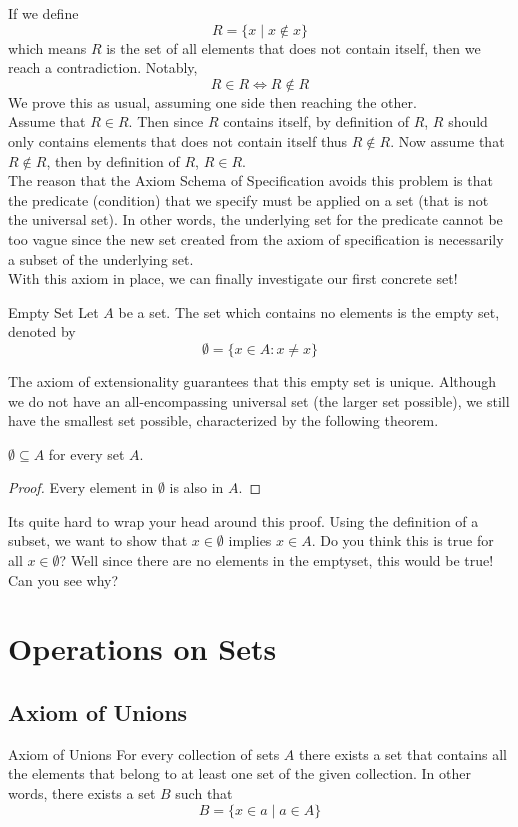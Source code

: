 \documentclass[a4paper]{article}
\begin{document}
If we define $$R=\{x\;|\;x\notin x\}$$ which means $R$ is the set of all elements that does not contain itself, then we reach a contradiction. Notably, $$R\in R\iff R\notin R$$ We prove this as usual, assuming one side then reaching the other. \\
Assume that $R\in R$. Then since $R$ contains itself, by definition of $R$, $R$ should only contains elements that does not contain itself thus $R\notin R$. Now assume that $R\notin R$, then by definition of $R$, $R\in R$. \\
The reason that the Axiom Schema of Specification avoids this problem is that the predicate (condition) that we specify must be applied on a set (that is not the universal set). In other words, the underlying set for the predicate cannot be too vague since the new set created from the axiom of specification is necessarily a subset of the underlying set. \\
With this axiom in place, we can finally investigate our first concrete set!

\begin{defn}{Empty Set}{} Let $A$ be a set. The set which contains no elements is the empty set, denoted by $$\emptyset=\{x\in A:x\neq x\}$$
\end{defn}

The axiom of extensionality guarantees that this empty set is unique. Although we do not have an all-encompassing universal set (the larger set possible), we still have the smallest set possible, characterized by the following theorem. 

\begin{thm}{}{} $\emptyset\subseteq A$ for every set $A$. 
\begin{proof} Every element in $\emptyset$ is also in $A$. 
\end{proof}
\end{thm}

Its quite hard to wrap your head around this proof. Using the definition of a subset, we want to show that $x\in\emptyset$ implies $x\in A$. Do you think this is true for all $x\in\emptyset$? Well since there are no elements in the emptyset, this would be true! Can you see why?

\pagebreak

\section{Operations on Sets}
\subsection{Axiom of Unions}
\begin{axm}{Axiom of Unions}{} For every collection of sets $A$ there exists a set that contains all the elements that belong to at least one set of the given collection. In other words, there exists a set $B$ such that $$B=\{x\in a\;|\;a\in A\}$$
\end{axm}
\end{document}
